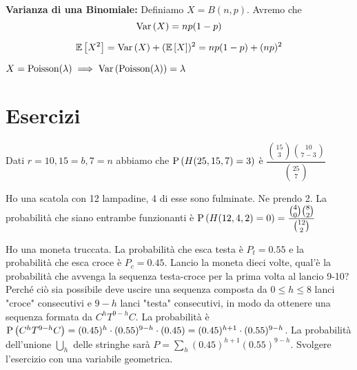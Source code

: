 \begin{defn}
    \textbf{Varianza di una Binomiale:}
    Definiamo $ X = B(n,p)$. Avremo che 
    \begin{equation*}
        \text{Var}\left(X\right) = np(1-p) 
    \end{equation*}
    
    \begin{note}
        \begin{equation*}
            \mathbb{E}\left[X^2\right] = \text{Var}\left(X\right) + (\mathbb{E}\left[X\right])^2 = np(1-p) + (np)^2
        \end{equation*}
    \end{note}
\end{defn}

\begin{defn}
    $ X = \text{Poisson}(\lambda)  \implies  \text{Var}\left(\text{Poisson}(\lambda)\right) = \lambda $
\end{defn}





\section{Esercizi}

\begin{exrc}
    \item Dati $ r = 10, 15 = b, 7 = n $ abbiamo che $ \text{P}\left(H(25,15,7) = 3\right) $ è $ \dfrac{\binom{15}{3}\binom{10}{7-3}}{\binom{25}{7}} $
    
    \item Ho una scatola con 12 lampadine, 4 di esse sono fulminate. Ne prendo 2. La probabilità che siano entrambe funzionanti è $ \text{P}\left(H(12, 4, 2) = 0\right) = \dfrac{\binom{4}{0}\binom{8}{2}}{\binom{12}{2}} $
    
    \item Ho una moneta truccata. La probabilità che esca testa è $ P_t = 0.55 $ e la probabilità che esca croce è $ P_c = 0.45 $. Lancio la moneta dieci volte, qual'è la probabilità che avvenga la sequenza testa-croce per la prima volta al lancio 9-10? Perché ciò sia possibile deve uscire una sequenza composta da $ 0 \leq h \leq 8 $ lanci "croce" consecutivi e $ 9-h $ lanci "testa" consecutivi, in modo da ottenere una sequenza formata da $ C^hT^{9-h}C $. La probabilità è $ \text{P}\left(C^hT^{9-h}C\right) = (0.45)^h \cdot (0.55)^{9-h} \cdot (0.45) = (0.45)^{h+1} \cdot (0.55)^{9-h}$. La probabilità dell'unione $ \bigcup_{h} $ delle stringhe sarà $ P = \sum_{h}(0.45)^{h+1}(0.55)^{9-h}$. Svolgere l'esercizio con una variabile geometrica.
    
\end{exrc}

